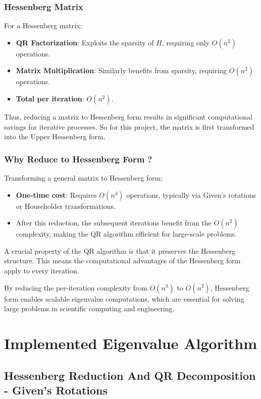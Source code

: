 \documentclass[12pt]{article}
\numberwithin{equation}{subsubsection}
\begin{document}
\subsubsection{Hessenberg Matrix}
For a Hessenberg matrix:
\begin{itemize}
	\item \textbf{QR Factorization}: Exploits the sparsity of $ H $, requiring only $ O(n^2) $ operations.
	\item \textbf{Matrix Multiplication}: Similarly benefits from sparsity, requiring $ O(n^2) $ operations.
	\item \textbf{Total per iteration}: $ O(n^2) $.
\end{itemize}
Thus, reducing a matrix to Hessenberg form results in significant computational savings for iterative processes. So for this project, the matrix is first transformed into the Upper Hessenberg form.

\subsubsection{Why Reduce to Hessenberg Form ?}
Transforming a general matrix to Hessenberg form:
\begin{itemize}
	\item \textbf{One-time cost}: Requires $ O(n^3) $ operations, typically via Given's rotations or Householder transformations.
	\item After this reduction, the subsequent iterations benefit from the $ O(n^2) $ complexity, making the QR algorithm efficient for large-scale problems.
\end{itemize}

A crucial property of the QR algorithm is that it preserves the Hessenberg structure. This means the computational advantages of the Hessenberg form apply to every iteration.

By reducing the per-iteration complexity from $ O(n^3) $ to $ O(n^2) $, Hessenberg form enables scalable eigenvalue computations, which are essential for solving large problems in scientific computing and engineering.


\section{Implemented Eigenvalue Algorithm}

\subsection{Hessenberg Reduction And QR Decomposition - Given's Rotations}
\end{document}
